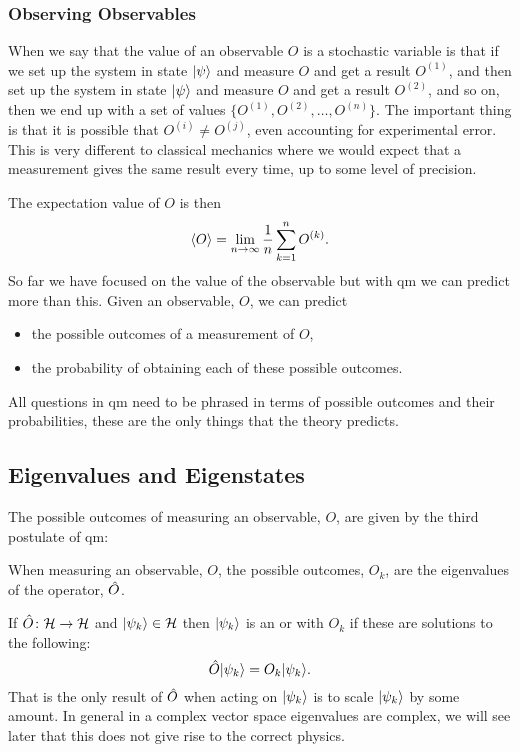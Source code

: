     \subsubsection{Observing Observables}
    When we say that the value of an observable \(O\) is a stochastic variable is that if we set up the system in state \(\vert {\psi} \rangle\) and measure \(O\) and get a result \(O^{(1)}\), and then set up the system in state \(\vert {\psi} \rangle\) and measure \(O\) and get a result \(O^{(2)}\), and so on, then we end up with a set of values \(\{O^{(1)}, O^{(2)}, \dotsc, O^{(n)}\}\).
    The important thing is that it is possible that \(O^{(i)}\ne O^{(j)}\), even accounting for experimental error.
    This is very different to classical mechanics where we would expect that a measurement gives the same result every time, up to some level of precision.
    
    The expectation value of \(O\) is then
    \[\langle{O}\rangle = \lim_{n\to\infty} \frac{1}{n}\sum_{k=1}^{n} O^{(k)}.\]
    So far we have focused on the value of the observable but with \acrshort{qm} we can predict more than this.
    Given an observable, \(O\), we can predict
    \begin{itemize}
        \item the possible outcomes of a measurement of \(O\),
        \item the probability of obtaining each of these possible outcomes.
    \end{itemize}
    All questions in \acrshort{qm} need to be phrased in terms of possible outcomes and their probabilities, these are the only things that the theory predicts.
    
    \subsection{Eigenvalues and Eigenstates}
    The possible outcomes of measuring an observable, \(O\), are given by the third postulate of \acrshort{qm}:
    \begin{postulate}
        When measuring an observable, \(O\), the possible outcomes, \(O_k\), are the eigenvalues of the operator, \(\hat{O}\).
    \end{postulate}
    If \(\hat{O}\colon\mathcal{H}\to\mathcal{H}\) and \(\vert {\psi_k} \rangle\in\mathcal{H}\) then \(\vert {\psi_k} \rangle\) is an  or  with  \(O_k\) if these are solutions to the following:
    \[\hat{O}\vert {\psi_k} \rangle = O_k\vert {\psi_k} \rangle.\]
    That is the only result of \(\hat{O}\) when acting on \(\vert {\psi_k} \rangle\) is to scale \(\vert {\psi_k} \rangle\) by some amount.
    In general in a complex vector space eigenvalues are complex, we will see later that this does not give rise to the correct physics.
    
